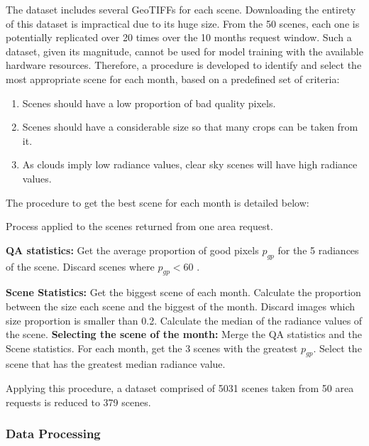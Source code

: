 The dataset includes several GeoTIFFs for each scene. Downloading the entirety of this dataset is impractical due to its huge size.  
From the 50 scenes, each one is potentially replicated over 20 times over the 10 months request window.
Such a dataset, given its magnitude, cannot be used for model training with the available hardware resources.
Therefore, a procedure is developed to identify and select the most appropriate scene for each month, based on a predefined set of criteria:

\begin{enumerate}
\item Scenes should have a low proportion of bad quality pixels.
\item Scenes should have a considerable size so that many crops can be taken from it.
\item As clouds imply low radiance values, clear sky scenes will have high radiance values.
\end{enumerate}


The procedure to get the best scene for each month is detailed below: 

\begin{algorithm}
\caption{Process applied to the scenes returned from one area request.}
\begin{algorithmic}[1]

\State \textbf{QA statistics:}
\State Get the average proportion of good pixels $p_{gp}$ for the 5 radiances of the scene.
\State Discard scenes where $p_{gp} < 60 $ .

\State \textbf{Scene Statistics:}
\State Get the biggest scene of each month.
\State Calculate the proportion between the size each scene and the biggest of the month.
\State Discard images which size proportion is smaller than 0.2.
\State Calculate the median of the radiance values of the scene.
\State \textbf{Selecting the scene of the month:}
\State Merge the QA statistics and the Scene statistics.
\State For each month, get the 3 scenes with the greatest $p_{gp}$.
\State Select the scene that has the greatest median radiance value.
\end{algorithmic}
\end{algorithm}

Applying this procedure, a dataset comprised of 5031 scenes taken from 50 area requests is reduced to 379 scenes.

\subsubsection{Data Processing}

